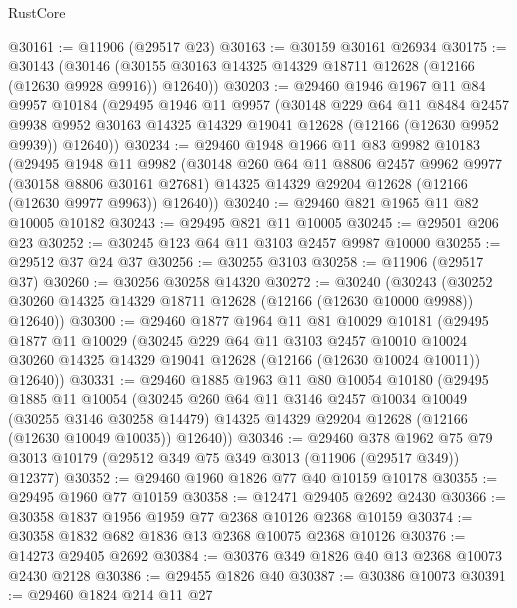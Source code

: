 \begin{lexlean}{RustCore}
\begin{coremodule}
@30161 := @11906 (@29517 @23)
@30163 := @30159 @30161 @26934
@30175 := @30143
    (@30146 (@30155 @30163 @14325 @14329 @18711 @12628 (@12166 (@12630 @9928 @9916)) @12640))
@30203 := @29460
    @1946
    @1967
    @11
    @84
    @9957
    @10184
    (@29495
      @1946
      @11
      @9957
      (@30148
        @229
        @64
        @11
        @8484
        @2457
        @9938
        @9952
        @30163
        @14325
        @14329
        @19041
        @12628
        (@12166 (@12630 @9952 @9939))
        @12640))
@30234 := @29460
    @1948
    @1966
    @11
    @83
    @9982
    @10183
    (@29495
      @1948
      @11
      @9982
      (@30148
        @260
        @64
        @11
        @8806
        @2457
        @9962
        @9977
        (@30158 @8806 @30161 @27681)
        @14325
        @14329
        @29204
        @12628
        (@12166 (@12630 @9977 @9963))
        @12640))
@30240 := @29460 @821 @1965 @11 @82 @10005 @10182
@30243 := @29495 @821 @11 @10005
@30245 := @29501 @206 @23
@30252 := @30245 @123 @64 @11 @3103 @2457 @9987 @10000
@30255 := @29512 @37 @24 @37
@30256 := @30255 @3103
@30258 := @11906 (@29517 @37)
@30260 := @30256 @30258 @14320
@30272 := @30240
    (@30243 (@30252 @30260 @14325 @14329 @18711 @12628 (@12166 (@12630 @10000 @9988)) @12640))
@30300 := @29460
    @1877
    @1964
    @11
    @81
    @10029
    @10181
    (@29495
      @1877
      @11
      @10029
      (@30245
        @229
        @64
        @11
        @3103
        @2457
        @10010
        @10024
        @30260
        @14325
        @14329
        @19041
        @12628
        (@12166 (@12630 @10024 @10011))
        @12640))
@30331 := @29460
    @1885
    @1963
    @11
    @80
    @10054
    @10180
    (@29495
      @1885
      @11
      @10054
      (@30245
        @260
        @64
        @11
        @3146
        @2457
        @10034
        @10049
        (@30255 @3146 @30258 @14479)
        @14325
        @14329
        @29204
        @12628
        (@12166 (@12630 @10049 @10035))
        @12640))
@30346 := @29460
    @378
    @1962
    @75
    @79
    @3013
    @10179
    (@29512 @349 @75 @349 @3013 (@11906 (@29517 @349)) @12377)
@30352 := @29460 @1960 @1826 @77 @40 @10159 @10178
@30355 := @29495 @1960 @77 @10159
@30358 := @12471 @29405 @2692 @2430
@30366 := @30358 @1837 @1956 @1959 @77 @2368 @10126 @2368 @10159
@30374 := @30358 @1832 @682 @1836 @13 @2368 @10075 @2368 @10126
@30376 := @14273 @29405 @2692
@30384 := @30376 @349 @1826 @40 @13 @2368 @10073 @2430 @2128
@30386 := @29455 @1826 @40
@30387 := @30386 @10073
@30391 := @29460 @1824 @214 @11 @27

\end{coremodule}
\end{lexlean}
